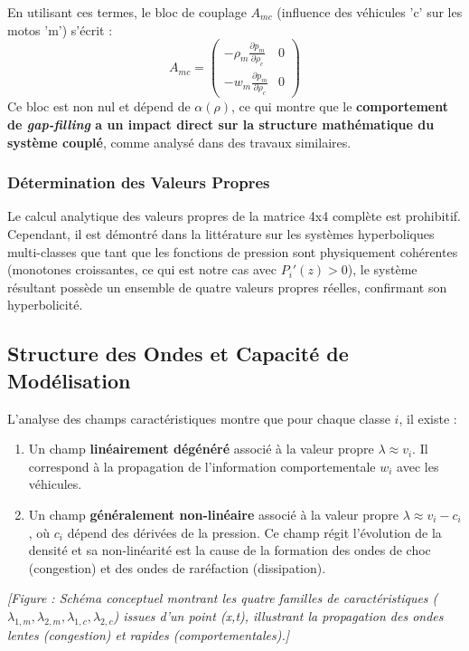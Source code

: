En utilisant ces termes, le bloc de couplage $A_{mc}$ (influence des véhicules 'c' sur les motos 'm') s'écrit :
\[ A_{mc} = \begin{pmatrix} -\rho_m \frac{\partial p_m}{\partial \rho_c} & 0 \\ -w_m \frac{\partial p_m}{\partial \rho_c} & 0 \end{pmatrix} \]
Ce bloc est non nul et dépend de $\alpha(\rho)$, ce qui montre que le \textbf{comportement de \textit{gap-filling} a un impact direct sur la structure mathématique du système couplé}, comme analysé dans des travaux similaires.

\subsubsection{Détermination des Valeurs Propres}
Le calcul analytique des valeurs propres de la matrice 4x4 complète est prohibitif. Cependant, il est démontré dans la littérature sur les systèmes hyperboliques multi-classes que tant que les fonctions de pression sont physiquement cohérentes (monotones croissantes, ce qui est notre cas avec $P_i'(z) > 0$), le système résultant possède un ensemble de quatre valeurs propres réelles, confirmant son hyperbolicité.

\subsection{Structure des Ondes et Capacité de Modélisation}
L'analyse des champs caractéristiques montre que pour chaque classe $i$, il existe :
\begin{enumerate}
    \item Un champ \textbf{linéairement dégénéré} associé à la valeur propre $\lambda \approx v_i$. Il correspond à la propagation de l'information comportementale $w_i$ avec les véhicules.
    \item Un champ \textbf{généralement non-linéaire} associé à la valeur propre $\lambda \approx v_i - c_i$, où $c_i$ dépend des dérivées de la pression. Ce champ régit l'évolution de la densité et sa non-linéarité est la cause de la formation des ondes de choc (congestion) et des ondes de raréfaction (dissipation).
\end{enumerate}

\textit{[Figure : Schéma conceptuel montrant les quatre familles de caractéristiques ($\lambda_{1,m}, \lambda_{2,m}, \lambda_{1,c}, \lambda_{2,c}$) issues d'un point (x,t), illustrant la propagation des ondes lentes (congestion) et rapides (comportementales).]}


